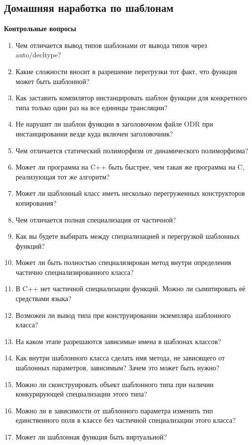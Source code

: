 \documentclass[a4paper,12pt,oneside]{article}
\begin{document}
\pagebreak
\subsection{Домашняя наработка по шаблонам}

\textbf{Контрольные вопросы}

\begin{enumerate}
\item Чем отличается вывод типов шаблонами от вывода типов через auto/decltype?
\item Какие сложности вносит в разрешение перегрузки тот факт, что функция может быть шаблонной?
\item Как заставить компилятор инстанцировать шаблон функции для конкретного типа только один раз на все единицы трансляции?
\item Не нарушит ли шаблон функции в заголовочном файле ODR при инстанцировании везде куда включен заголовочник?
\item Чем отличается статический полиморфизм от динамического полиморфизма?
\item Может ли программа на C++ быть быстрее, чем такая же программа на C, реализующая тот же алгоритм?
\item Может ли шаблонный класс иметь несколько перегруженных конструкторов копирования?
\item Чем отличается полная специализация от частичной?
\item Как вы будете выбирать между специализацией и перегрузкой шаблонных функций?
\item Может ли быть полностью специализирован метод внутри определения частично специализированного класса?
\item В C++ нет частичной специализации функций. Можно ли сымитировать её средствами языка?
\item Возможен ли вывод типа при конструировании экземпляра шаблонного класса?
\item На каком этапе разрешаются зависимые имена в шаблонах классов?
\item Как внутри шаблонного класса сделать имя метода, не зависящего от шаблонных параметров, зависимым? Зачем это может быть нужно?
\item Можно ли сконструировать объект шаблонного типа при наличии конкурирующей специализации этого типа?
\item Можно ли в зависимости от шаблонного параметра изменить тип единственного поля в классе без частичной специализации этого класса?
\item Может ли шаблонная функция быть виртуальной?

\end{enumerate}
\end{document}

